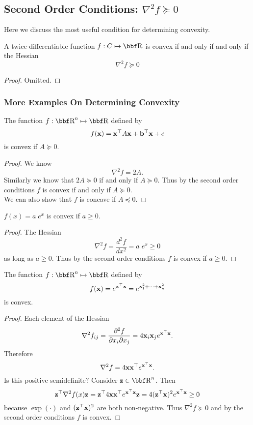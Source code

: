\documentclass{article}
\begin{document}
\subsection{Second Order Conditions: $\nabla^2 f \succeq 0$}

Here we discuss the most useful condition for determining convexity.
\begin{theorem}
    A twice-differentiable function $f : C \mapsto \RR$ is convex if and
    only if and only if the Hessian
    \[
        \nabla^2 f \succeq 0
    \]
\end{theorem}
\begin{proof}
    Omitted.
\end{proof}

\subsubsection{More Examples On Determining Convexity}

\begin{example}
    The function $f : \RR^n \mapsto \RR$ defined by
    \[
        f({\bf x}) = {\bf x}^\top A{\bf x} + {\bf b}^\top{\bf x} + c
    \]
    is convex if $A \succeq 0$.
\end{example}
\begin{proof}
    We know
    \[
        \nabla^2 f = 2A.
    \]
    Similarly we know that $2A \succeq 0$ if and only if
    $A \succeq 0$. Thus by the second order conditions $f$
    is convex if and only if $A \succeq 0$.\\

    We can also show that $f$ is concave if $A\preceq 0$.
\end{proof}

\begin{example}
    $f(x) = a\;e^x$ is convex if $a \geq 0$.
\end{example}
\begin{proof}
    The Hessian
    \[
        \nabla^2f = \frac{d^2f}{dx^2} = a\;e^x \geq 0
    \]
    as long as $a\geq0$. Thus by the second order conditions
    $f$ is convex if $a\geq0$.
\end{proof}

\begin{example}
    The function $f : \RR^n \mapsto \RR$ defined by
    \[
        f({\bf x}) = e^{{\bf x}^\top{\bf x}} = e^{{\bf x}_1^2 + \dots + {\bf x}_n^2}
    \]
    is convex.
\end{example}
\begin{proof}
    Each element of the Hessian
    \[
        \nabla^2f_{ij} = \frac{\partial^2 f}{\partial x_i \partial x_j} = 4{\bf x}_i{\bf x}_j e^{{\bf x}^\top{\bf x}}.
    \]
    Therefore
    \[
        \nabla^2f = 4{\bf x}{\bf x}^\top e^{{\bf x}^\top{\bf x}}.
    \]
    Is this positive semidefinite? Consider $\zz\in\RR^n$. Then
    \[
        {\bf z}^\top\nabla^2 f(x){\bf z} = {\bf z}^\top4{\bf x}{\bf x}^\top e^{{\bf x}^\top{\bf x}} {\bf z} = 4({\bf z}^\top{\bf x})^2 e^{{\bf x}^\top{\bf x}} \geq 0
    \]
    because $\exp(\cdot)$ and $({\bf z}^\top{\bf x})^2$ are both non-negative.
    Thus $\nabla^2f \succeq 0$ and by the second order conditions
    $f$ is convex.
\end{proof}
\end{document}
